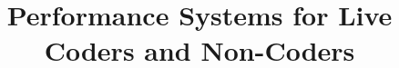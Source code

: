 \documentclass{nime-alternate}
\begin{document}
%

\title{Performance Systems for Live Coders and Non-Coders}

%
%
%
%
%
\end{document}
